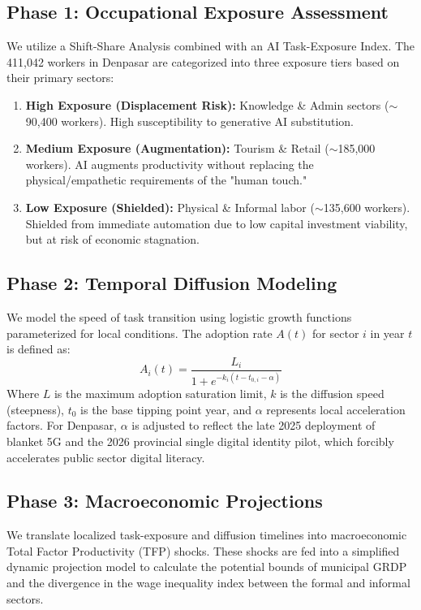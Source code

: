 \documentclass[11pt, a4paper]{article}
\begin{document}
  \subsection{Phase 1: Occupational Exposure Assessment}
  We utilize a Shift-Share Analysis combined with an AI Task-Exposure Index. The 411,042 workers in Denpasar are categorized into three exposure tiers based on their primary sectors:
    \begin{enumerate}
  \item \textbf{High Exposure (Displacement Risk):} Knowledge \& Admin sectors ($\sim$90,400 workers). High susceptibility to generative AI substitution.
  \item \textbf{Medium Exposure (Augmentation):} Tourism \& Retail ($\sim$185,000 workers). AI augments productivity without replacing the physical/empathetic requirements of the "human touch."
  \item \textbf{Low Exposure (Shielded):} Physical \& Informal labor ($\sim$135,600 workers). Shielded from immediate automation due to low capital investment viability, but at risk of economic stagnation.
  \end{enumerate}
  
  \subsection{Phase 2: Temporal Diffusion Modeling}
  We model the speed of task transition using logistic growth functions parameterized for local conditions. The adoption rate $A(t)$ for sector $i$ in year $t$ is defined as:
    \begin{equation}
  A_i(t) = \frac{L_i}{1 + e^{-k_i (t - t_{0,i} - \alpha)}}
  \end{equation}
  Where $L$ is the maximum adoption saturation limit, $k$ is the diffusion speed (steepness), $t_0$ is the base tipping point year, and $\alpha$ represents local acceleration factors. For Denpasar, $\alpha$ is adjusted to reflect the late 2025 deployment of blanket 5G and the 2026 provincial single digital identity pilot, which forcibly accelerates public sector digital literacy.
  
  \subsection{Phase 3: Macroeconomic Projections}
  We translate localized task-exposure and diffusion timelines into macroeconomic Total Factor Productivity (TFP) shocks. These shocks are fed into a simplified dynamic projection model to calculate the potential bounds of municipal GRDP and the divergence in the wage inequality index between the formal and informal sectors.
  
\end{document}
